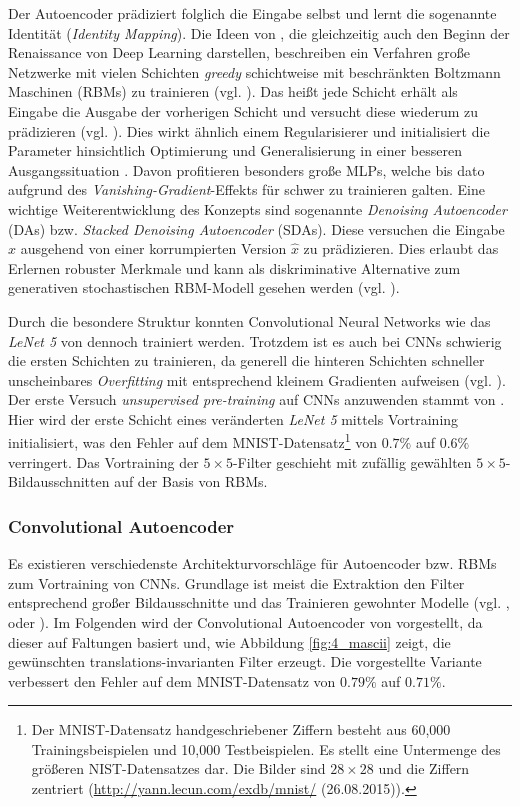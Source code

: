 Der Autoencoder prädiziert folglich die Eingabe selbst und lernt die sogenannte Identität (\textit{Identity Mapping}).
Die Ideen von \cite{Hinton2006}, die gleichzeitig auch den Beginn der Renaissance von Deep Learning darstellen, beschreiben ein Verfahren große Netzwerke mit vielen Schichten \textit{greedy} schichtweise mit beschränkten Boltzmann Maschinen (RBMs) zu trainieren (vgl. \cite{Bengio2007}). Das heißt jede Schicht erhält als Eingabe die Ausgabe der vorherigen Schicht und versucht diese wiederum zu prädizieren (vgl. \cite{Ranzato2006}). Dies wirkt ähnlich einem Regularisierer und initialisiert die Parameter hinsichtlich Optimierung und Generalisierung in einer besseren Ausgangssituation \cite{Erhan2010}. Davon profitieren besonders große MLPs, welche bis dato aufgrund des \textit{Vanishing-Gradient}-Effekts für schwer zu trainieren galten. Eine wichtige Weiterentwicklung des Konzepts sind sogenannte \textit{Denoising Autoencoder} (DAs) bzw. \textit{Stacked Denoising Autoencoder} (SDAs). Diese versuchen die Eingabe $ x $ ausgehend von einer korrumpierten Version $ \hat{x} $ zu prädizieren. Dies erlaubt das Erlernen robuster Merkmale und kann als diskriminative Alternative zum generativen stochastischen RBM-Modell gesehen werden (vgl. \cite{Vincent2008}). 

Durch die besondere Struktur konnten Convolutional Neural Networks wie das \textit{LeNet 5} von \cite{LeCun1998} dennoch trainiert werden. Trotzdem ist es auch bei CNNs schwierig die ersten Schichten zu trainieren, da generell die hinteren Schichten schneller unscheinbares \textit{Overfitting} mit entsprechend kleinem Gradienten aufweisen (vgl. \cite{Erhan2010}). Der erste Versuch \textit{unsupervised pre-training} auf CNNs anzuwenden stammt von \cite{Ranzato2006}. Hier wird der erste Schicht eines veränderten \textit{LeNet 5} mittels Vortraining initialisiert, was den Fehler auf dem MNIST-Datensatz\footnote{Der MNIST-Datensatz handgeschriebener Ziffern besteht aus 60,000 Trainingsbeispielen und 10,000 Testbeispielen. Es stellt eine Untermenge des größeren NIST-Datensatzes dar. Die Bilder sind $28 \times 28$ und die Ziffern zentriert (\url{http://yann.lecun.com/exdb/mnist/} (26.08.2015)).} von $0.7 \%$ auf $0.6 \%$ verringert. Das Vortraining der $5 \times 5$-Filter geschieht mit zufällig gewählten $5 \times 5$-Bildausschnitten auf der Basis von RBMs.


\subsubsection{Convolutional Autoencoder}
\label{ch:autoenc}
Es existieren verschiedenste Architekturvorschläge für Autoencoder bzw. RBMs zum Vortraining von CNNs. Grundlage ist meist die Extraktion den Filter entsprechend großer Bildausschnitte und das Trainieren gewohnter Modelle (vgl. \cite{Desjardins2008}, \cite{Ranzato2007} oder \cite{Lee2009}).  
Im Folgenden wird der Convolutional Autoencoder von \cite{Masci2011} vorgestellt, da dieser auf Faltungen basiert und, wie Abbildung \ref{fig:4_mascii} zeigt, die gewünschten translations-invarianten Filter erzeugt. Die vorgestellte Variante verbessert den Fehler auf dem MNIST-Datensatz von $0.79 \%$ auf $0.71 \%$.

